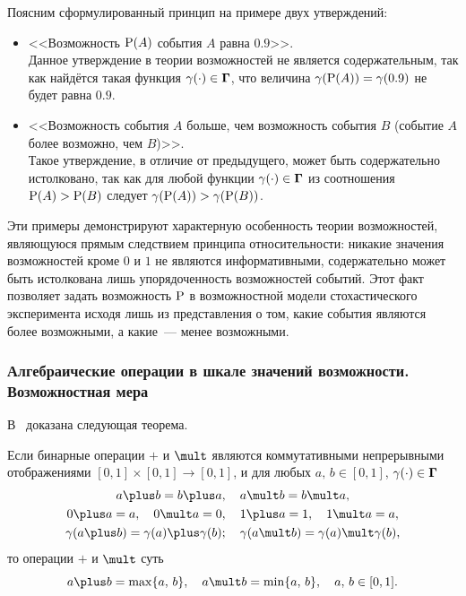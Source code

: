 Поясним сформулированный принцип на примере двух утверждений:
\begin{itemize}
\item
    <<Возможность $\P(A)$ события $A$ равна $0.9$>>.\\
    Данное утверждение в теории возможностей не является содержательным, так как найдётся такая функция $\gamma(\cdot)\in\bTheta$, что величина $\gamma(\P(A))=\gamma(0.9)$ не будет равна $0.9$.

\item
    <<Возможность события $A$ больше, чем возможность события $B$ (событие $A$ более возможно, чем $B$)>>.\\
    Такое утверждение, в отличие от предыдущего, может быть содержательно истолковано, так как для любой функции $\gamma(\cdot)\in\bTheta$ из соотношения $\P(A)>\P(B)$ следует $\gamma(\P(A))>\gamma(\P(B))$.
\end{itemize}

Эти примеры демонстрируют характерную особенность теории возможностей, являющуюся прямым следствием принципа относительности: никакие значения возможностей кроме $0$ и $1$ не являются информативными, содержательно может быть истолкована лишь упорядоченность возможностей событий. Этот факт позволяет задать возможность $\P$ в возможностной модели стохастического эксперимента исходя лишь из представления о том, какие события являются более возможными, а какие~--- менее возможными.

\subsubsection{Алгебраические операции в шкале значений возможности. Возможностная мера}
\label{sec:sec_20151029_03}

В~\cite{possbook, possbook2} доказана следующая теорема.
\begin{theorem}
\label{th:plus_mult_operations}
Если бинарные операции $\plus$ и $\mult$ являются коммутативными непрерывными отображениями $[0,1]\times[0,1]\to[0,1]$, и для любых $a,\, b\in[0,1]$, $\gamma(\cdot)\in\bTheta$
\begin{gather*}
    a\plus b = b\plus a, \quad a\mult b = b\mult a,\\
    0\plus a = a, \quad 0\mult a = 0, \quad 1\plus a = 1, \quad 1\mult a = a,\\
    \gamma(a\plus b) = \gamma(a) \plus \gamma(b); \quad \gamma(a\mult b) = \gamma(a) \mult \gamma(b),
\end{gather*}
то операции $\plus$ и $\mult$ суть
\begin{equation}
\label{20151029_01}
    a \plus b = \max\{a,\, b\}, \quad a \mult b = \min\{a,\, b\}, \quad a,\,b \in [0,1].
\end{equation}
\end{theorem}

